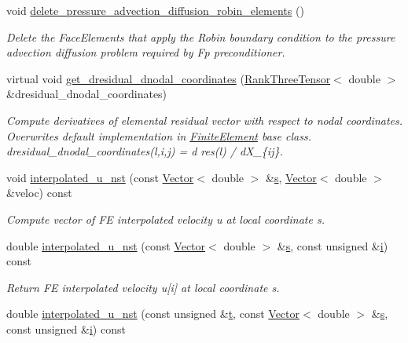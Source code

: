 \begin{DoxyCompactItemize}
void \hyperlink{classoomph_1_1NavierStokesEquations_aae9c4d4a523e3f0c9280df798ec606a9}{delete\+\_\+pressure\+\_\+advection\+\_\+diffusion\+\_\+robin\+\_\+elements} ()
\begin{DoxyCompactList}\small\item\em Delete the Face\+Elements that apply the Robin boundary condition to the pressure advection diffusion problem required by Fp preconditioner. \end{DoxyCompactList}\item 
virtual void \hyperlink{classoomph_1_1NavierStokesEquations_a5b4bfb29d32e40fe536ee2a5934daddb}{get\+\_\+dresidual\+\_\+dnodal\+\_\+coordinates} (\hyperlink{classoomph_1_1RankThreeTensor}{Rank\+Three\+Tensor}$<$ double $>$ \&dresidual\+\_\+dnodal\+\_\+coordinates)
\begin{DoxyCompactList}\small\item\em Compute derivatives of elemental residual vector with respect to nodal coordinates. Overwrites default implementation in \hyperlink{classoomph_1_1FiniteElement}{Finite\+Element} base class. dresidual\+\_\+dnodal\+\_\+coordinates(l,i,j) = d res(l) / d\+X\+\_\+\{ij\}. \end{DoxyCompactList}\item 
void \hyperlink{classoomph_1_1NavierStokesEquations_a34a6866cf9a762ece4c5610d6d25eee9}{interpolated\+\_\+u\+\_\+nst} (const \hyperlink{classoomph_1_1Vector}{Vector}$<$ double $>$ \&\hyperlink{cfortran_8h_ab7123126e4885ef647dd9c6e3807a21c}{s}, \hyperlink{classoomph_1_1Vector}{Vector}$<$ double $>$ \&veloc) const
\begin{DoxyCompactList}\small\item\em Compute vector of FE interpolated velocity u at local coordinate s. \end{DoxyCompactList}\item 
double \hyperlink{classoomph_1_1NavierStokesEquations_a61521b081e019b3803ac824128c54ddc}{interpolated\+\_\+u\+\_\+nst} (const \hyperlink{classoomph_1_1Vector}{Vector}$<$ double $>$ \&\hyperlink{cfortran_8h_ab7123126e4885ef647dd9c6e3807a21c}{s}, const unsigned \&\hyperlink{cfortran_8h_adb50e893b86b3e55e751a42eab3cba82}{i}) const
\begin{DoxyCompactList}\small\item\em Return FE interpolated velocity u\mbox{[}i\mbox{]} at local coordinate s. \end{DoxyCompactList}\item 
double \hyperlink{classoomph_1_1NavierStokesEquations_a1102659657117d04827fbd7b8b1f6d94}{interpolated\+\_\+u\+\_\+nst} (const unsigned \&\hyperlink{cfortran_8h_af6f0bd3dc13317f895c91323c25c2b8f}{t}, const \hyperlink{classoomph_1_1Vector}{Vector}$<$ double $>$ \&\hyperlink{cfortran_8h_ab7123126e4885ef647dd9c6e3807a21c}{s}, const unsigned \&\hyperlink{cfortran_8h_adb50e893b86b3e55e751a42eab3cba82}{i}) const

\end{DoxyCompactItemize}
